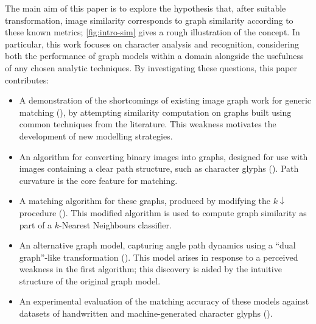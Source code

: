 \documentclass{mpaper}
\begin{document}
The main aim of this paper is to explore the hypothesis that, after suitable transformation, image similarity corresponds to graph similarity according to these known metrics; \cref{fig:intro-sim} gives a rough illustration of the concept.
In particular, this work focuses on character analysis and recognition, considering both the performance of graph models within a domain alongside the usefulness of any chosen analytic techniques.
By investigating these questions, this paper contributes:
\begin{itemize}
	\item A demonstration of the shortcomings of existing image graph work for generic matching (), by attempting similarity computation on graphs built using common techniques from the literature. %
	This weakness motivates the development of new modelling strategies.
	

	\item An algorithm for converting binary images into graphs, designed for use with images containing a clear path structure, such as character glyphs ().
	Path curvature is the core feature for matching.
	
	\item A matching algorithm for these graphs, produced by modifying the $k\downarrow$ \cite{Between-MCS-SIP} procedure ().
	This modified algorithm is used to compute graph similarity as part of a $k$-Nearest Neighbours classifier.
	
	\item An alternative graph model, capturing angle path dynamics using a ``dual graph''-like transformation ().
	This model arises in response to a perceived weakness in the first algorithm; this discovery is aided by the intuitive structure of the original graph model.
	
	\item An experimental evaluation of the matching accuracy of these models against datasets of handwritten and machine-generated character glyphs ().

\end{itemize}
\end{document}
